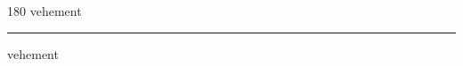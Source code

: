 
\begin{frame}
\begin{center}
\begin{turn}{180}
{\fontsize{2.5cm}{1em}\selectfont vehement}
\end{turn}
\vspace{1em}\par  
\hrule
\vspace{1em}\par  
{\fontsize{2.5cm}{1em}\selectfont vehement}
\end{center}
\end{frame}
